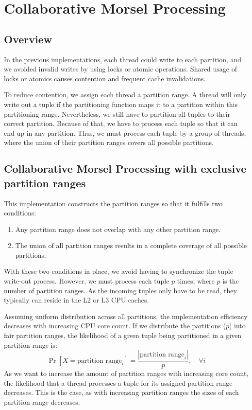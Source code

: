 \section{Collaborative Morsel Processing}\label{section-Collaborative-Morsel-Processing}
\subsection{Overview}
In the previous implementations, each thread could write to each partition, and we avoided invalid writes by using locks or atomic operations.
Shared usage of locks or atomics causes contention and frequent cache invalidations.

To reduce contention, we assign each thread a partition range.
A thread will only write out a tuple if the partitioning function maps it to a partition within this partitioning range.
Nevertheless, we still have to partition all tuples to their correct partition.
Because of that, we have to process each tuple so that it can end up in any partition.
Thus, we must process each tuple by a group of threads, where the union of their partition ranges covers all possible partitions.
\subsection{Collaborative Morsel Processing with exclusive partition ranges}\label{section-CMP-with_exclusive-partition-ranges}
This implementation constructs the partition ranges so that it fulfills two conditions:
\begin{enumerate}
  \item Any partition range does not overlap with any other partition range.
  \item The union of all partition ranges results in a complete coverage of all possible partitions.
\end{enumerate}
With these two conditions in place, we avoid having to synchronize the tuple write-out process.
However, we must process each tuple $p$ times, where $p$ is the number of partition ranges.
As the incoming tuples only have to be read, they typically can reside in the L2 or L3 \ac{CPU} caches.

Assuming uniform distribution across all partitions, the implementation efficiency decreases with increasing CPU core count.
If we distribute the partitions ($p$) into fair partition ranges, the likelihood of a given tuple being partitioned in a given partition range is:
\begin{equation}\label{equation-CMP-exclusive-partition-ranges}
  \Pr[X=\textrm{partition range}_i] = \frac{|\textrm{partition range}_i|}{p},  \quad \forall i
\end{equation}
As we want to increase the amount of partition ranges with increasing core count, the likelihood that a thread processes a tuple for its assigned partition range decreases.
This is the case, as with increasing partition ranges the sizes of each partition range decreases.
